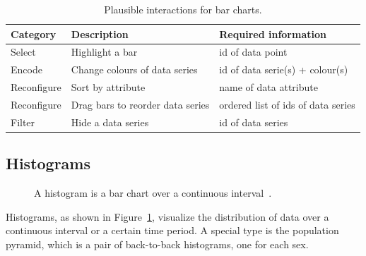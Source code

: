 \begin{table}[H]
  \centering
  \caption{Plausible interactions for bar charts.}
  \label{tab:analysis:bar-charts:interactions}
  \begin{tabularx}{\linewidth}{lXX}
    \bf Category & \bf Description & \bf Required information \\
    \hline
    Select & Highlight a bar & id of data point \\
    Encode & Change colours of data series & id of data serie(s) + colour(s) \\
    Reconfigure & Sort by attribute & name of data attribute \\
    Reconfigure & Drag bars to reorder data series & ordered list of ids of data series \\
    Filter & Hide a data series & id of data series \\
  \end{tabularx}
\end{table}

\subsection{Histograms}

\begin{figure}
  \centering
  \qquad
  \caption{A histogram is a bar chart over a continuous interval~\parencite{VisualizationCatalogue2017}.}%
  \label{fig:analysis:histograms}
\end{figure}

Histograms, as shown in Figure~\ref{fig:analysis:histograms}, visualize the distribution of data over a continuous interval or a certain time period.
A special type is the population pyramid, which is a pair of back-to-back histograms, one for each sex.


